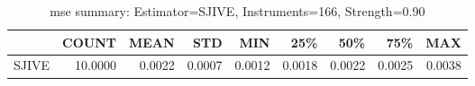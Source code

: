 \begin{table}[ht]
\centering
\caption{mse summary: Estimator=SJIVE, Instruments=166, Strength=0.90}
\begin{tabular}{lrrrrrrrr}
\toprule
 & COUNT & MEAN & STD & MIN & 25\% & 50\% & 75\% & MAX \\
\midrule
SJIVE & 10.0000 & 0.0022 & 0.0007 & 0.0012 & 0.0018 & 0.0022 & 0.0025 & 0.0038 \\
\bottomrule
\end{tabular}
\end{table}
